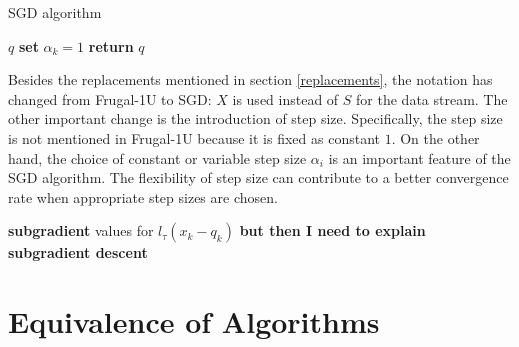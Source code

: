 \begin{algorithm}
    \caption{SGD algorithm}\label{alg:SGD}
    \begin{algorithmic}[1]
         $q$                 
                              
                \State \textbf{set} $\alpha_k = 1$  
                                  
                \Else                           {}
                \EndIf
            \EndFor
        \State \textbf{return} $q$              
    \end{algorithmic}
\end{algorithm}
Besides the replacements mentioned in section \ref{replacements}, the notation has changed from Frugal-1U to SGD: 
$X$ is used instead of $S$ for the data stream. The other important change is the introduction of step size. Specifically, the step size is not mentioned in Frugal-1U because it is fixed as constant $1$. On the other hand, the choice of constant or variable step size $\alpha_i$ is an important feature of the SGD algorithm. The flexibility of step size can contribute to a better convergence rate when appropriate step sizes are chosen.


\textbf{subgradient} values for $l_\tau(x_k - q_k)$ 
{\color{red} \textbf{but then I need to explain subgradient descent}} 
\section{Equivalence of Algorithms}
\label{sec: algo_equivalence}

